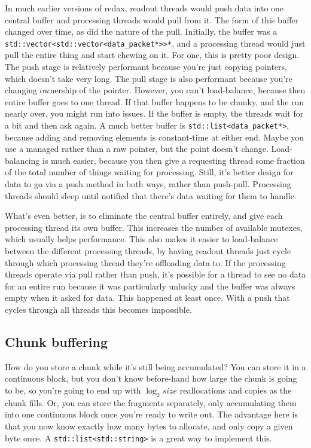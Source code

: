 In much earlier versions of redax, readout threads would push data into one central buffer and processing threads would pull from it.
The form of this buffer changed over time, as did the nature of the pull.
Initially, the buffer was a \texttt{std::vector<std::vector<data\_packet*>>*}, and a processing thread would just pull the entire thing and start chewing on it.
For one, this is pretty poor design.
The push stage is relatively performant because you're just copying pointers, which doesn't take very long.
The pull stage is also performant because you're changing ownership of the pointer.
However, you can't load-balance, because then entire buffer goes to one thread.
If that buffer happens to be chunky, and the run nearly over, you might run into issues.
If the buffer is empty, the threads wait for a bit and then ask again.
A much better buffer is \texttt{std::list<data\_packet*>}, because adding and removing elements is constant-time at either end.
Maybe you use a managed rather than a raw pointer, but the point doesn't change.
Load-balancing is much easier, because you then give a requesting thread some fraction of the total number of things waiting for processing.
Still, it's better design for data to go via a push method in both ways, rather than push-pull.
Processing threads should sleep until notified that there's data waiting for them to handle.

What's even better, is to eliminate the central buffer entirely, and give each processing thread its own buffer.
This increases the number of available mutexes, which usually helps performance.
This also makes it easier to load-balance between the different processing threads, by having readout threads just cycle through which processing thread they're offloading data to.
If the processing threads operate via pull rather than push, it's possible for a thread to see no data for an entire run because it was particularly unlucky and the buffer was always empty when it asked for data.
This happened at least once.
With a push that cycles through all threads this becomes impossible.

\subsection{Chunk buffering}

How do you store a chunk while it's still being accumulated?
You can store it in a continuous block, but you don't know before-hand how large the chunk is going to be, so you're going to end up with $\log_2 size$ reallocations and copies as the chunk fills.
Or, you can store the fragments separately, only accumulating them into one continuous block once you're ready to write out.
The advantage here is that you now know exactly how many bytes to allocate, and only copy a given byte once.
A \texttt{std::list<std::string>} is a great way to implement this.

